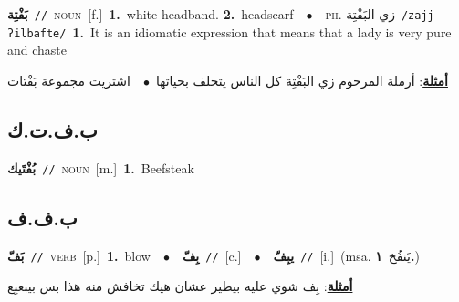 \documentclass[10pt,a4paper,twoside]{article} %
\begin{document}
\begin{multicols}{2}
{\setlength\topsep{0pt}\textbf{\foreignlanguage{arabic}{بَفْتِة}}\ {\color{gray}\texttt{//}\color{black}}\ \textsc{noun}\ [f.]\ \textbf{1.}~white headband.  \textbf{2.}~headscarf\ \ $\bullet$\ \ \textsc{ph.} \color{gray} \foreignlanguage{arabic}{زي البَفْتِة}\color{black}\ {\color{gray}\texttt{/{\sffamily zajj ʔilbafte}/}\color{black}}\ \textbf{1.}~It is an idiomatic expression that means that a lady is very pure and chaste\  \begin{flushright}\color{gray}\foreignlanguage{arabic}{\textbf{\underline{\foreignlanguage{arabic}{أمثلة}}}: أرملة المرحوم زي البَفْتِة كل الناس يتحلف بحياتها\ $\bullet$\ \  اشتريت مجموعة بَفْتات}\end{flushright}\color{black}} \vspace{2mm}

\vspace{-3mm}
\subsection*{\color{blue}\foreignlanguage{arabic}{ب.ف.ت.ك}\color{blue}{ (ntws)}} 

{\setlength\topsep{0pt}\textbf{\foreignlanguage{arabic}{بُفْتَيك}}\ {\color{gray}\texttt{//}\color{black}}\ \textsc{noun}\ [m.]\ \textbf{1.}~Beefsteak\ } \vspace{2mm}

\vspace{-3mm}
\subsection*{\color{blue}\foreignlanguage{arabic}{ب.ف.ف}\color{blue}{}} 

{\setlength\topsep{0pt}\textbf{\foreignlanguage{arabic}{بَفّ}}\ {\color{gray}\texttt{//}\color{black}}\ \textsc{verb}\ [p.]\ \textbf{1.}~blow\ \ $\bullet$\ \ \setlength\topsep{0pt}\textbf{\foreignlanguage{arabic}{بِفّ}}\ {\color{gray}\texttt{//}\color{black}}\ [c.]\ \ $\bullet$\ \ \setlength\topsep{0pt}\textbf{\foreignlanguage{arabic}{يبِفّ}}\ {\color{gray}\texttt{//}\color{black}}\ [i.]\ \color{gray}(msa. \foreignlanguage{arabic}{يَنفُخ}~\foreignlanguage{arabic}{\textbf{١.}})\color{black}\  \begin{flushright}\color{gray}\foreignlanguage{arabic}{\textbf{\underline{\foreignlanguage{arabic}{أمثلة}}}: بِف شوي عليه بيطير عشان هيك تخافش منه هذا بس بيبعبِع}\end{flushright}\color{black}} \vspace{2mm}


\end{multicols}
\end{document}
